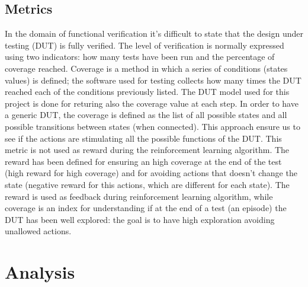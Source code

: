 \documentclass{article}
\begin{document}
\subsection{Metrics}
% 
% 
In the domain of functional verification it's difficult to state that the design under testing (DUT) is fully verified. The level of verification is normally expressed using two indicators: how many tests have been run and the percentage of coverage reached. Coverage is a method in which a series of conditions (states values) is defined; the software used for testing collects how many times the DUT reached each of the conditions previously listed. The DUT model used for this project is done for returing also the coverage value at each step. In order to have a generic DUT, the coverage is defined as the list of all possible states and all possible transitions between states (when connected). This approach ensure us to see if the actions are stimulating all the possible functions of the DUT.  This metric is not used as reward during the reinforcement learning algorithm. The reward has been defined for ensuring an high coverage at the end of the test (high reward for high coverage) and for avoiding actions that doesn't change the state (negative reward for this actions, which are different for each state). The reward is used as feedback during reinforcement learning algorithm, while coverage is an index for understanding if at the end of a test (an episode) the DUT has been well explored: the goal is to have high exploration avoiding unallowed actions.

\section{Analysis}
% 
\end{document}
